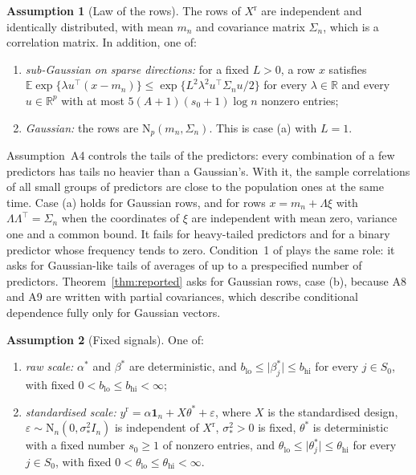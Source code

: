 \documentclass[11pt]{article}
\newcommand{\R}{\mathbb{R}}
\newcommand{\E}{\mathbb{E}}
\newcommand{\one}{\mathbf{1}}
\newcommand{\N}{\mathrm{N}}
\newcommand{\abs}[1]{\lvert #1\rvert}
\newcommand{\yr}{y^{\mathrm r}}
\newcommand{\Xr}{X^{\mathrm r}}
\newcommand{\bstar}{\beta^*}
\newcommand{\tstar}{\theta^*}
\newcommand{\sigs}{\sigma_*}
\newcommand{\Sz}{S_0}
\newcommand{\sz}{s_0}
\newcommand{\Sig}{\Sigma_n}
\theoremstyle{plain}
\theoremstyle{definition}
\newtheorem{asm}{Assumption}
\begin{document}
\begin{asm}[Law of the rows]\label{a:rows}
The rows of $\Xr$ are independent and identically distributed, with mean $m_n$ and covariance matrix $\Sig$, which is a
correlation matrix. In addition, one of:
\begin{enumerate}[label=(\alph*)]
  \item \emph{sub-Gaussian on sparse directions:} for a fixed $L>0$, a row $x$ satisfies
    $\E\exp\{\lambda u^\top(x-m_n)\}\le\exp\{L^2\lambda^2u^\top\Sig u/2\}$ for every $\lambda\in\R$ and every $u\in\R^p$
    with at most $5(A+1)(\sz+1)\log n$ nonzero entries;
  \item \emph{Gaussian:} the rows are $\N_p(m_n,\Sig)$. This is case (a) with $L=1$.
\end{enumerate}
\end{asm}

Assumption~A4 controls the tails of the predictors: every combination of a few predictors has tails no heavier than a
Gaussian's. With it, the sample correlations of all small groups of predictors are close to the population ones at the
same time. Case (a) holds for Gaussian rows, and for rows $x=m_n+\Lambda\xi$ with $\Lambda\Lambda^\top=\Sig$ when the coordinates of
$\xi$ are independent with mean zero, variance one and a common bound. It fails for heavy-tailed predictors and for a
binary predictor whose frequency tends to zero. Condition~1 of \citet{SongLiang2015} plays the same role: it asks for
Gaussian-like tails of averages of up to a prespecified number of predictors. Theorem~\ref{thm:reported} asks for
Gaussian rows, case (b), because A8 and A9 are written with partial covariances, which describe conditional dependence
fully only for Gaussian vectors.

\begin{asm}[Fixed signals]\label{a:fs}
One of:
\begin{enumerate}[label=(\alph*)]
  \item \emph{raw scale:} $\alpha^*$ and $\bstar$ are deterministic, and $b_{\mathrm{lo}}\le\abs{\beta^*_j}\le
    b_{\mathrm{hi}}$ for every $j\in\Sz$, with fixed $0<b_{\mathrm{lo}}\le b_{\mathrm{hi}}<\infty$;
  \item \emph{standardised scale:} $\yr=\alpha\one_n+X\tstar+\varepsilon$, where $X$ is the standardised design,
    $\varepsilon\sim\N_n(0,\sigs^2I_n)$ is independent of $\Xr$, $\sigs^2>0$ is fixed, $\tstar$ is deterministic with a
    fixed number $\sz\ge1$ of nonzero entries, and $\theta_{\mathrm{lo}}\le\abs{\theta^*_j}\le\theta_{\mathrm{hi}}$ for
    every $j\in\Sz$, with fixed $0<\theta_{\mathrm{lo}}\le\theta_{\mathrm{hi}}<\infty$.
\end{enumerate}
\end{asm}
\end{document}
